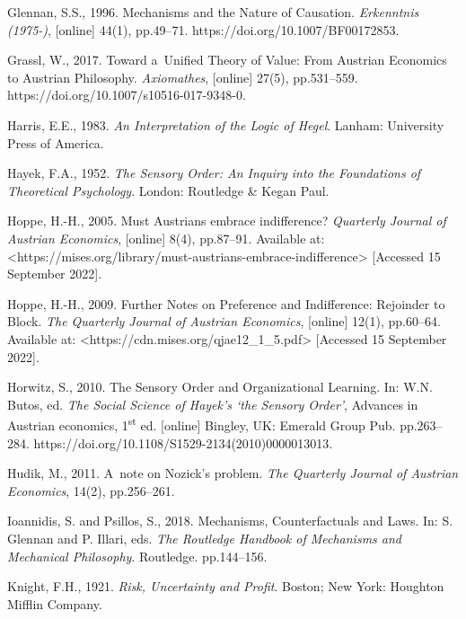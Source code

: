 Glennan, S.S., 1996. Mechanisms and the Nature of Causation. \textit{Erkenntnis (1975-)}, [online] 44(1), pp.49–71. https://doi.org/10.1007/BF00172853.



Grassl, W., 2017. Toward a~Unified Theory of Value: From Austrian Economics to Austrian Philosophy. \textit{Axiomathes}, [online] 27(5), pp.531–559. https://doi.org/10.1007/s10516-017-9348-0.



Harris, E.E., 1983. \textit{An Interpretation of the Logic of Hegel}. Lanham: University Press of America.



Hayek, F.A., 1952. \textit{The Sensory Order: An Inquiry into the Foundations of Theoretical Psychology}. London: Routledge \& Kegan Paul.



Hoppe, H.-H., 2005. Must Austrians embrace indifference? \textit{Quarterly Journal of Austrian Economics}, [online] 8(4), pp.87–91. Available at: {\textless}https://mises.org/library/must-austrians-embrace-indifference{\textgreater} [Accessed 15 September 2022].



Hoppe, H.-H., 2009. Further Notes on Preference and Indifference: Rejoinder to Block. \textit{The Quarterly Journal of Austrian Economics}, [online] 12(1), pp.60–64. Available at: {\textless}https://cdn.mises.org/qjae12\_1\_5.pdf{\textgreater} [Accessed 15 September 2022].



Horwitz, S., 2010. The Sensory Order and Organizational Learning. In: W.N. Butos, ed. \textit{The Social Science of Hayek's ‘the Sensory Order'}, Advances in Austrian economics, 1\textsuperscript{st} ed. [online] Bingley, UK: Emerald Group Pub. pp.263–284. https://doi.org/10.1108/S1529-2134(2010)0000013013.



Hudik, M., 2011. A~note on Nozick's problem. \textit{The Quarterly Journal of Austrian Economics}, 14(2), pp.256–261.



Ioannidis, S. and Psillos, S., 2018. Mechanisms, Counterfactuals and Laws. In: S. Glennan and P. Illari, eds. \textit{The Routledge Handbook of Mechanisms and Mechanical Philosophy}. Routledge. pp.144–156.



Knight, F.H., 1921. \textit{Risk, Uncertainty and Profit}. Boston; New York: Houghton Mifflin Company.




